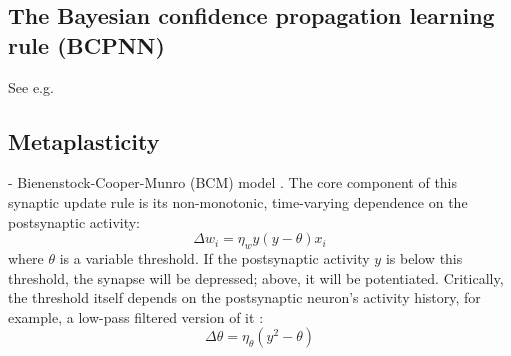 \documentclass{article}
\theoremstyle{definition} \newtheorem{definition}{Definition}
\theoremstyle{remark} \newtheorem{remark}{Remark}
\newcounter{ct}
\begin{document}
\subsection{The Bayesian confidence propagation learning rule (BCPNN)}
See e.g. \citep{lansner2023fast}

\subsection{Metaplasticity}
 - Bienenstock-Cooper-Munro (BCM) model \cite{bienenstock1982theory}. The core component of this synaptic update rule is its non-monotonic, time-varying dependence on the postsynaptic activity:  
\begin{equation}
    \Delta w_i = \eta_w y (y - \theta) x_i
\end{equation}
where $\theta$ is a variable threshold. If the postsynaptic activity $y$ is below this threshold, the synapse will be depressed; above, it will be potentiated. Critically, the threshold itself depends on the postsynaptic neuron’s activity history, for example, a low-pass filtered version of it \cite[Ch.~8.2]{dayan2005theoretical}:  
\begin{equation}
    \Delta \theta = \eta_\theta (y^2 - \theta)
\end{equation}
\end{document}
